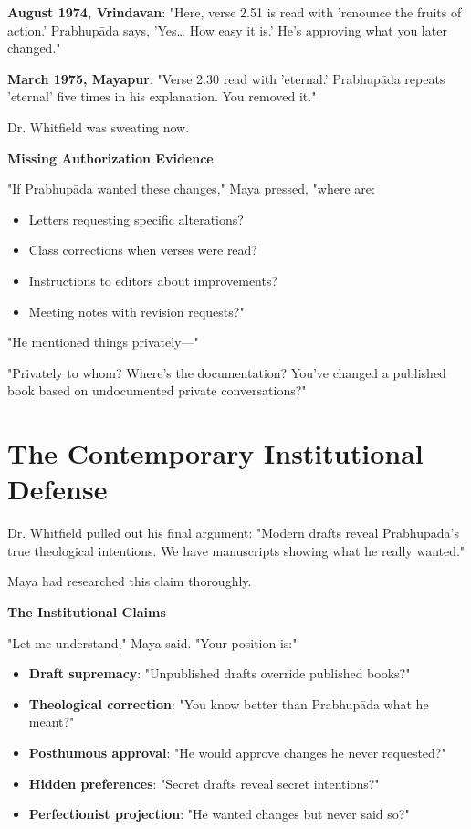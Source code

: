 \documentclass[11pt,twoside]{book}
\begin{document}
\textbf{\textbf{August 1974, Vrindavan}}: "Here, verse 2.51 is read with 'renounce the fruits of action.' Prabhupāda says, 'Yes\ldots{} How easy it is.' He's approving what you later changed."

\textbf{\textbf{March 1975, Mayapur}}: "Verse 2.30 read with 'eternal.' Prabhupāda repeats 'eternal' five times in his explanation. You removed it."

Dr. Whitfield was sweating now.

\textbf{\textbf{Missing Authorization Evidence}}

"If Prabhupāda wanted these changes," Maya pressed, "where are:
\begin{itemize}
\item Letters requesting specific alterations?
\item Class corrections when verses were read?
\item Instructions to editors about improvements?
\item Meeting notes with revision requests?"
\end{itemize}

"He mentioned things privately—"

"Privately to whom? Where's the documentation? You've changed a published book based on undocumented private conversations?"
\section*{The Contemporary Institutional Defense}
\label{sec:org37124ab}

Dr. Whitfield pulled out his final argument: "Modern drafts reveal Prabhupāda's true theological intentions. We have manuscripts showing what he really wanted."

Maya had researched this claim thoroughly.

\textbf{\textbf{The Institutional Claims}}

"Let me understand," Maya said. "Your position is:"

\begin{itemize}
\item \textbf{\textbf{Draft supremacy}}: "Unpublished drafts override published books?"
\item \textbf{\textbf{Theological correction}}: "You know better than Prabhupāda what he meant?"
\item \textbf{\textbf{Posthumous approval}}: "He would approve changes he never requested?"
\item \textbf{\textbf{Hidden preferences}}: "Secret drafts reveal secret intentions?"
\item \textbf{\textbf{Perfectionist projection}}: "He wanted changes but never said so?"
\end{itemize}
\end{document}
